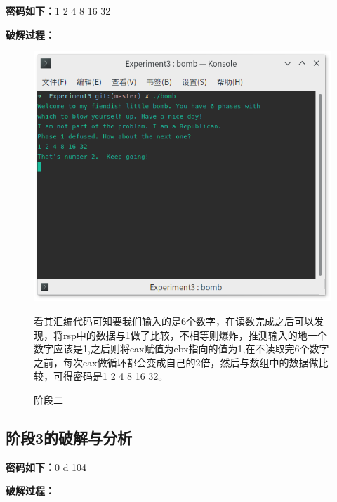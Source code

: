 \textbf{密码如下：}1 2 4 8 16 32

\textbf{破解过程：}

\begin{figure}[H]
    \begin{minipage}[l]{0.4\linewidth}
        \centering
        \includegraphics[width=\linewidth]{figures/Bomb-2}
        \caption{阶段二}
        \label{fig:bomb-2}
    \end{minipage}
    \begin{minipage}[r]{0.5\linewidth}
        看其汇编代码可知要我们输入的是6个数字，在读数完成之后可以发现，将rsp中的数据与1做了比较，不相等则爆炸，推测输入的地一个数字应该是1,之后则将eax赋值为ebx指向的值为1,在不读取完6个数字之前，每次eax做循环都会变成自己的2倍，然后与数组中的数据做比较，可得密码是1 2 4 8 16 32。
    \end{minipage}
\end{figure}

\subsection{阶段3的破解与分析}

\textbf{密码如下：}0 d 104

\textbf{破解过程：}


